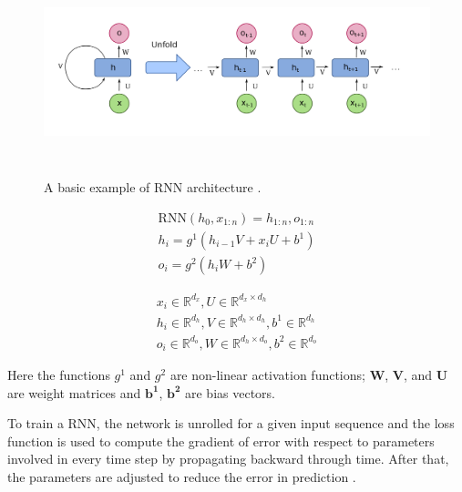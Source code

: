 \documentclass[a4paper, 11pt]{article}
\begin{document}

\begin{figure}[htpb!]
    \centering
    \includegraphics[width=\textwidth,height=6cm,keepaspectratio=true]
    {Recurrent_neural_network_unfold.png}
    \caption{
        A basic example of RNN architecture \parencite{WikipediaEN_RNN_unfold}.
    }
    \label{fig:A basic RNN architecture}
\end{figure}

\begin{align*}
\mathrm{RNN}(h_0,x_{1:n}) = h_{1:n}, o_{1:n} \\
h_i = g^1(h_{i-1}V + x_iU + b^1) \\
o_i = g^2(h_iW + b^2) 
\end{align*}

\begin{align*}
x_i \in \mathbb{R}^{d_x}, U \in \mathbb{R}^{d_x \times d_h} \\
h_i \in \mathbb{R}^{d_h}, V \in \mathbb{R}^{d_h \times d_h}, b^1 \in \mathbb{R}^{d_h} \\
o_i \in \mathbb{R}^{d_o}, W \in \mathbb{R}^{d_h \times d_o}, b^2 \in \mathbb{R}^{d_o}
\end{align*}

Here the functions $g^{1}$ and $g^{2}$ are non-linear activation functions; $\mathbf{W}$, $\mathbf{V}$, and $\mathbf{U}$ are weight matrices and $\mathbf{b^{1}}$, $\mathbf{b^{2}}$ are bias vectors. 

To train a RNN, the network is unrolled for a given input sequence and the loss function is used to compute the gradient of error with respect to parameters involved in every time step by propagating backward through time. After that, the parameters are adjusted to reduce the error in prediction \parencite{Werbos1990}. 
\end{document}
